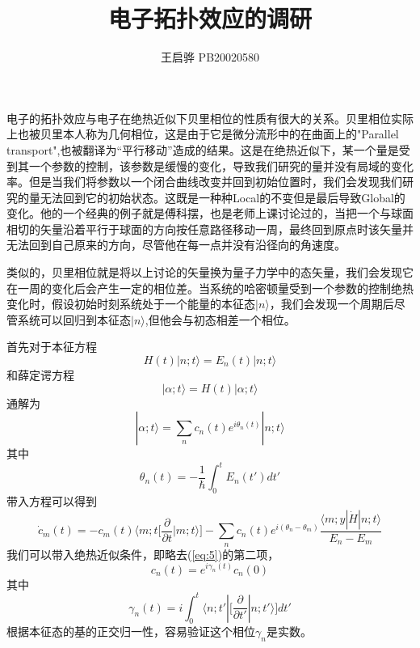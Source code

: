 \documentclass{article}
\title{\songti \zihao{2}\bfseries 电子拓扑效应的调研}
\author{王启骅 PB20020580}
\begin{document}
	\maketitle
	电子的拓扑效应与电子在绝热近似下贝里相位的性质有很大的关系。贝里相位实际上也被贝里本人称为几何相位，这是由于它是微分流形中的在曲面上的"Parallel transport",也被翻译为“平行移动”造成的结果。这是在绝热近似下，某一个量是受到其一个参数的控制，该参数是缓慢的变化，导致我们研究的量并没有局域的变化率。但是当我们将参数以一个闭合曲线改变并回到初始位置时，我们会发现我们研究的量无法回到它的初始状态。这既是一种种Local的不变但是最后导致Global的变化。他的一个经典的例子就是傅科摆，也是老师上课讨论过的，当把一个与球面相切的矢量沿着平行于球面的方向按任意路径移动一周，最终回到原点时该矢量并无法回到自己原来的方向，尽管他在每一点并没有沿径向的角速度。
	
	
	类似的，贝里相位就是将以上讨论的矢量换为量子力学中的态矢量，我们会发现它在一周的变化后会产生一定的相位差。当系统的哈密顿量受到一个参数的控制绝热变化时，假设初始时刻系统处于一个能量的本征态$ |n\rangle $，我们会发现一个周期后尽管系统可以回归到本征态$ |n\rangle $,但他会与初态相差一个相位。
	
	
	首先对于本征方程
	\begin{equation}
		H(t)|n;t\rangle=E_n(t)|n;t\rangle
	\end{equation}
	和薛定谔方程
	\begin{equation}
		|\alpha;t\rangle=H(t)|\alpha;t\rangle
	\end{equation}
	通解为
	\begin{equation}
		|\alpha;t\rangle=\sum_{n}c_n(t)e^{i\theta_n(t)}|n;t\rangle
	\end{equation}
其中
\begin{equation}
	\theta_n(t)=-\frac{1}{\hbar}\int_{0}^{t}E_n(t')dt'
\end{equation}
带入方程可以得到
\begin{equation}
	\dot{c}_m(t)=-c_m(t)\langle m;t\bigg[\dfrac{\partial}{\partial t }|m;t\rangle\bigg]-\sum_{n}c_n(t)e^{i(\theta_n-\theta_m)}\frac{\langle m;y|\dot{H}|n;t\rangle}{E_n-E_m}
	\label{eq:5}
\end{equation}
我们可以带入绝热近似条件，即略去(\ref{eq:5})的第二项，
\begin{equation}
	c_n(t)=e^{i\gamma_n(t)}c_n(0)
\end{equation}
其中
\begin{equation}
	\gamma_n(t)=i\int_{0}^{t}\langle n;t'|\bigg[\dfrac{\partial}{\partial t'}|n;t'\rangle\bigg]dt'
\end{equation}
根据本征态的基的正交归一性，容易验证这个相位$ \gamma_n $是实数。
\end{document}
